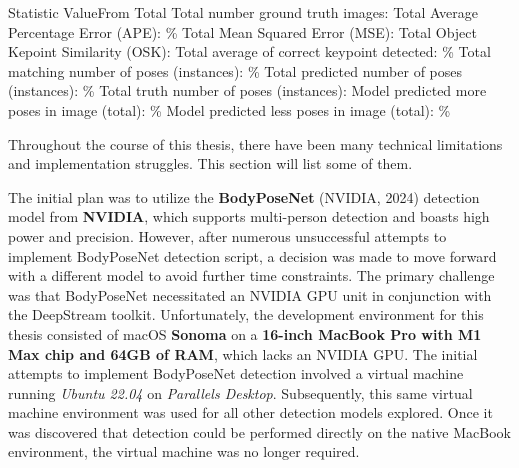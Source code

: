     \setupTABLE[r][1][style=bold]
    \setupTABLE[c][each][offset=3dd]
    \setupTABLE[frame=off]
    \setupTABLE[r][1][topframe=on,bottomframe=on]
    \setupTABLE[c][each][leftframe=on]
    \setupTABLE[c][1][leftframe=off]
    \setupTABLE[c][2,3][align=middle]
    \bTR
        \bTD Statistic                              \eTD\bTD      Value\eTD\bTD  From Total\eTD\eTR
    \bTR
        \bTD Total number ground truth images:           \eTD{} \eTD\bTD     \eTD\eTR
    \bTR
        \bTD Total Average Percentage Error (APE):       \eTD{}\% \eTD\bTD     \eTD\eTR
    \bTR
        \bTD Total Mean Squared Error (MSE):             \eTD{} \eTD\bTD     \eTD\eTR
    \bTR
        \bTD Total Object Kepoint Similarity (OSK):      \eTD{} \eTD\bTD    \eTD\eTR
    \bTR
        \bTD Total average of correct keypoint detected: \eTD{}\% \eTD\bTD     \eTD\eTR
    \bTR
        \bTD Total matching number of poses (instances): \eTD{} \eTD{}\% \eTD\eTR
    \bTR
        \bTD Total predicted number of poses (instances):\eTD{} \eTD{}\% \eTD\eTR
    \bTR
        \bTD Total truth number of poses (instances):    \eTD{} \eTD\bTD     \eTD\eTR
    \bTR
        \bTD Model predicted more poses in image (total):\eTD{} \eTD{}\% \eTD\eTR
    \bTR
        \bTD Model predicted less poses in image (total):\eTD{} \eTD{}\% \eTD\eTR

Throughout the course of this thesis, there have been many technical limitations and implementation struggles. This section will list some of them.

The initial plan was to utilize the {\bf BodyPoseNet} (NVIDIA, 2024) detection model from {\bf NVIDIA}, which supports multi-person detection and boasts high power and precision. However, after numerous unsuccessful attempts to implement BodyPoseNet detection script, a decision was made to move forward with a different model to avoid further time constraints. The primary challenge was that BodyPoseNet necessitated an NVIDIA GPU unit in conjunction with the DeepStream toolkit. Unfortunately, the development environment for this thesis consisted of macOS {\bf Sonoma} on a {\bf 16-inch MacBook Pro with M1 Max chip and 64GB of RAM}, which lacks an NVIDIA GPU. The initial attempts to implement BodyPoseNet detection involved a virtual machine running {\em Ubuntu 22.04} on {\em Parallels Desktop}. Subsequently, this same virtual machine environment was used for all other detection models explored. Once it was discovered that detection could be performed directly on the native MacBook environment, the virtual machine was no longer required.

